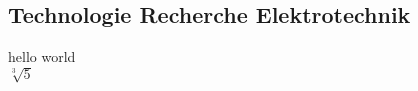 \documentclass[../main.tex]{subfiles}
\begin{document}
\subsection{Technologie Recherche Elektrotechnik}
hello world\\
$\sqrt[3]{5}$
\end{document}
